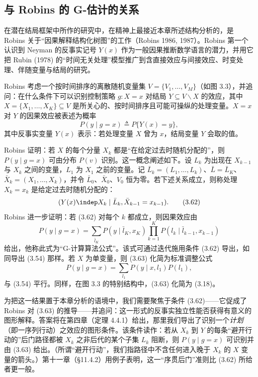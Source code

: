\subsection{与 Robins 的 G-估计的关系}

在潜在结局框架中所作的研究中，在精神上最接近本章所述结构分析的，是 Robins 关于“因果解释结构化树图”的工作（Robins 1986, 1987）。Robins 第一个认识到 Neyman 的反事实记号 $Y(x)$ 作为一般因果推断数学语言的潜力，并用它把 Rubin (1978) 的“时间无关处理”模型推广到含直接效应与间接效应、时变处理、伴随变量与结局的研究。

Robins 考虑一个按时间排序的离散随机变量集 $V=\{V_1,\dots,V_M\}$（如图 3.3），并追问：在什么条件下可以识别控制策略 $g:X=x$ 对结局 $Y\subseteq V\backslash X$ 的效应，其中 $X=\{X_1,\dots,X_K\}\subseteq V$ 是所关心的、按时间排序且可能可操纵的处理变量。$X=x$ 对 $Y$ 的因果效应被表述为概率
\[
P(y\mid g=x)\triangleq P\{Y(x)=y\},
\]
其中反事实变量 $Y(x)$ 表示：若处理变量 $X$ 曾为 $x$，结局变量 $Y$ 会取的值。

Robins 证明：若 $X$ 的每个分量 $X_k$ 都是“在给定过去时随机分配的”，则 $P(y\mid g=x)$ 可由分布 $P(v)$ 识别。这一概念阐述如下。设 $L_k$ 为出现在 $X_{k-1}$ 与 $X_k$ 之间的变量，$L_1$ 为 $X_1$ 之前的变量。记 $\bar{L}_k=(L_1,\dots,L_k)$、$\bar{L}=\bar{L}_K$、$\bar{X}_k=(X_1,\dots,X_k)$，并令 $\bar{L}_0$、$\bar{X}_0$、$V_0$ 恒为零。若下述关系成立，则称处理 $X_k=x_k$ 是给定过去时随机分配的：
\begin{equation}
(Y(x)\indep X_k\mid \bar{L}_k,\bar{X}_{k-1}=x_{k-1}). \tag{3.62}
\end{equation}
Robins 进一步证明：若 \textup{(3.62)} 对每个 $k$ 都成立，则因果效应由
\begin{equation}
P(y\mid g=x)=\sum_{\bar{l}_K}P(y\mid \bar{l}_K,x_K)\prod_{k=1}^{K}P(l_k\mid \bar{l}_{k-1},x_{k-1}) \tag{3.63}
\end{equation}
给出，他称此式为“G-计算算法公式”。该式可通过迭代施用条件 \textup{(3.62)} 导出，如同导出 \textup{(3.54)} 那样。若 $X$ 为单变量，则 \textup{(3.63)} 化简为标准调整公式
\[
P(y\mid g=x)=\sum_{l_1}P(y\mid x,l_1)P(l_1),
\]
与 \textup{(3.54)} 平行。同样，在图 3.3 的特别结构中，\textup{(3.63)} 化简为 \textup{(3.18)}。

为把这一结果置于本章分析的语境中，我们需要聚焦于条件 \textup{(3.62)}——它促成了 Robins 对 \textup{(3.63)} 的推导——并追问：这一形式的反事实独立性能否获得有意义的图形解释。答案将在第四章（定理 4.4.1）给出，那里我们导出了识别一个\emph{计划}（即一序列行动）之效应的图形条件。该条件读作：若从 $X_k$ 到 $Y$ 的每条“避开行动的”后门路径都被 $X_k$ 之非后代的某个子集 $L_k$ 阻断，则 $P(y\mid g=x)$ 可识别并由 \textup{(3.63)} 给出。（所谓“避开行动”，我们指路径中不含任何进入晚于 $X_k$ 的 $X$ 变量的箭头。）第十一章（\S 11.4.2）用例子表明，这一“序贯后门”准则比 \textup{(3.62)} 所给者更一般。


